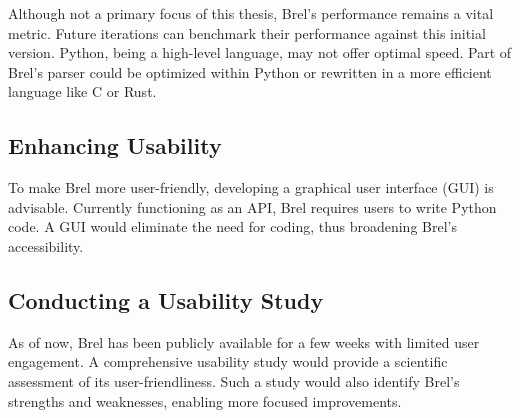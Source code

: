 Although not a primary focus of this thesis, Brel's performance remains a vital metric.
Future iterations can benchmark their performance against this initial version.
Python, being a high-level language, may not offer optimal speed.
Part of Brel's parser could be optimized within Python or rewritten in a more efficient language like C or Rust.



\subsection{Enhancing Usability}

To make Brel more user-friendly, developing a graphical user interface (GUI) is advisable.
Currently functioning as an API, Brel requires users to write Python code.
A GUI would eliminate the need for coding, thus broadening Brel's accessibility.


\subsection{Conducting a Usability Study}

As of now, Brel has been publicly available for a few weeks with limited user engagement.
A comprehensive usability study would provide a scientific assessment of its user-friendliness.
Such a study would also identify Brel's strengths and weaknesses, enabling more focused improvements.

